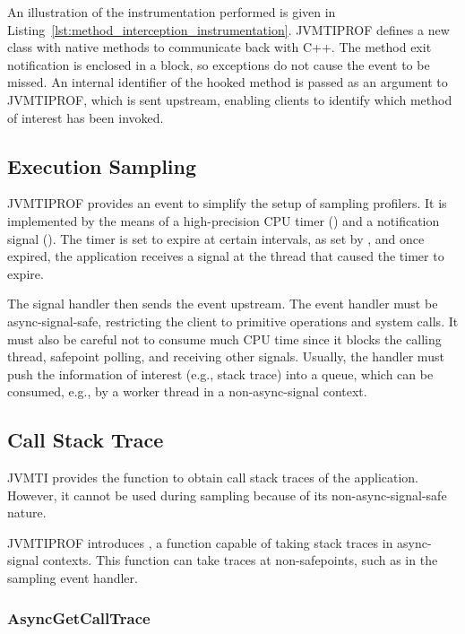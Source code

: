 An illustration of the instrumentation performed is given in Listing~\ref{lst:method_interception_instrumentation}. JVMTIPROF defines a new class with native methods to communicate back with C++. The method exit notification is enclosed in a  block, so exceptions do not cause the event to be missed. An internal identifier of the hooked method is passed as an argument to JVMTIPROF, which is sent upstream, enabling clients to identify which method of interest has been invoked.

\subsection{Execution Sampling}

JVMTIPROF provides an event to simplify the setup of sampling profilers. It is implemented by the means of a high-precision CPU timer () and a notification signal (). The timer is set to expire at certain intervals, as set by , and once expired, the application receives a signal at the thread that caused the timer to expire.

The signal handler then sends the event upstream. The event handler must be async-signal-safe, restricting the client to primitive operations and system calls. It must also be careful not to consume much CPU time since it blocks the calling thread, safepoint polling, and receiving other signals. Usually, the handler must push the information of interest (e.g., stack trace) into a queue, which can be consumed, e.g., by a worker thread in a non-async-signal context.

\subsection{Call Stack Trace} \label{sec:impl_callstacktrace}

JVMTI provides the  function to obtain call stack traces of the application. However, it cannot be used during sampling because of its non-async-signal-safe nature.

JVMTIPROF introduces , a function capable of taking stack traces in async-signal contexts. This function can take traces at non-safepoints, such as in the sampling event handler.

\subsubsection*{AsyncGetCallTrace}

